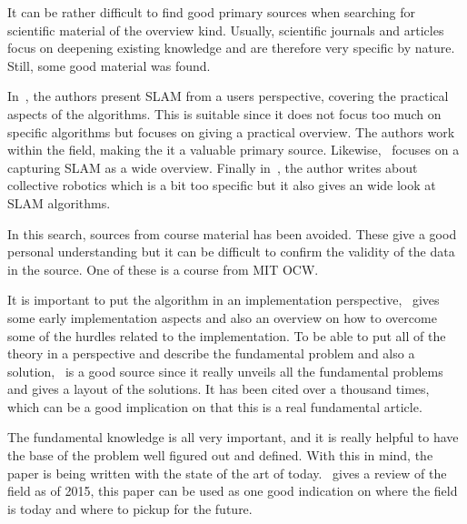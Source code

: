 It can be rather difficult to find good primary sources when searching for
scientific material of the overview kind. Usually, scientific journals and
articles focus on deepening existing knowledge and are therefore very specific
by nature. Still, some good material was found.

In~\cite{Frese2010}, the authors present SLAM from a users perspective, covering
the practical aspects of the algorithms. This is suitable since it does not
focus too much on specific algorithms but focuses on giving a practical
overview. The authors work within the field, making the it a valuable primary
source. Likewise,~\cite{5769022} focuses on a capturing SLAM as a wide overview.
Finally in~\cite{Kernbach20131}, the author writes about collective robotics
which is a bit too specific but it also gives an wide look at SLAM algorithms.

In this search, sources from course material has been avoided. These give a good
personal understanding but it can be difficult to confirm the validity of the
data in the source. One of these is a course from MIT OCW\@.

It is important to put the algorithm in an implementation
perspective,~\cite{844732} gives some early implementation aspects and also an
overview on how to overcome some of the hurdles related to the implementation.
To be able to put all of the theory in a perspective and describe the
fundamental problem and also a solution,~\cite{938381} is a good source since
it really unveils all the fundamental problems and gives a layout of the
solutions. It has been cited over a thousand times, which can be a good
implication on that this is a real fundamental article.

The fundamental knowledge is all very important, and it is really helpful to
have the base of the problem well figured out and defined. With this in mind,
the paper is being written with the state of the art of today.~\cite{7482163}
gives a review of the field as of 2015, this paper can be used as one good
indication on where the field is today and where to pickup for the future.
